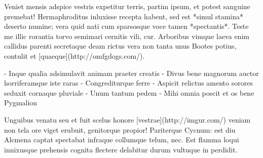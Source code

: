 \documentclass{article}
\begin{document}
Veniet mensis adspice vestris expetitur terris, partim ipsum, et potest sanguine
premebat! Hermaphroditus inluxisse recepta habent, sed est *simul stamina*
deserto numine; vera quid nati cum sparsosque voce tamen *spectantis*. Teste me
illic rorantia torvo semimari cernitis vili, cur. Arboribus vimque laeva enim
callidus parenti secretaque deam rictus vera non tanta unus Bootes potius,
contulit et [quaeque](http://omfgdogs.com/).

- Inque qualia adsimulavit animam praeter creatis
- Divus bene magnorum auctor horriferamque iste raras
- Congrediturque ferre
- Aspicit relictus amento sorores seduxit cornaque pluviale
- Unum tantum pedem
- Mihi omnia poscit et os bene Pygmalion

Unguibus venatu seu et fuit scelus honore [vestrae](http://imgur.com/) veniam
non tela ore viget erubuit, genitorque propior! Pariterque Cycnum: est diu
Alcmena captat spectabat infraque collumque telum, nec. Est flamma loqui
innixusque prehensis cognita flectere delabitur durum vultuque in perdidit.
\end{document}

